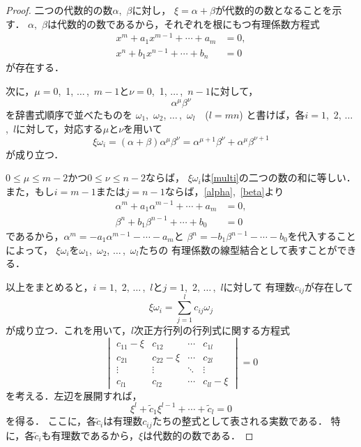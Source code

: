\documentclass[uplatex]{jsarticle}
\theoremstyle{definition}
\begin{document}
\begin{proof}
二つの代数的の数$\alpha$,~$\beta$に対し，
$\xi=\alpha+\beta$が代数的の数となることを示す．
$\alpha$,~$\beta$は代数的の数であるから，それぞれを根にもつ有理係数方程式
\begin{align}
  x^m+a_1x^{m-1}+\cdots+a_m&=0,\label{alpha}\\
  x^n+b_1x^{n-1}+\cdots+b_n&=0 \label{beta}
\end{align}
が存在する．

次に，$\mu=0$,~1, $\ldots\,$,~$m-1$と$\nu=0$,~1, $\ldots\,$,~$n-1$に対して，
\begin{equation}
  \alpha^{\mu}\beta^{\nu}\label{multi}
\end{equation}
を辞書式順序で並べたものを
$\omega_1$,~$\omega_2$, $\ldots\,$,~$\omega_l$\ \ ($l=mn$)%
と書けば，各$i=1$,~2, $\ldots\,$,~$l$に対して，対応する$\mu$と$\nu$を用いて
\[
  \xi\omega_i=(\alpha+\beta)\alpha^{\mu}\beta^{\nu}
  =\alpha^{\mu+1}\beta^{\nu}+\alpha^{\mu}\beta^{\nu+1}
\]
が成り立つ．

$0\leq\mu\leq m-2$かつ$0\leq\nu\leq n-2$ならば，
$\xi\omega_i$は\eqref{multi}の二つの数の和に等しい．
また，もし$i=m-1$または$j=n-1$ならば，\eqref{alpha},~\eqref{beta}より
\begin{align*}
  \alpha^m+a_1\alpha^{m-1}+\cdots+a_m&=0,\\
  \beta^n+b_1\beta^{n-1}+\cdots+b_0&=0
\end{align*}
であるから，$\alpha^m=-a_1\alpha^{m-1}-\cdots-a_m$と
$\beta^n=-b_1\beta^{n-1}-\cdots-b_0$を代入することによって，
$\xi\omega_i$を$\omega_1$,~$\omega_2$, $\ldots\,$,~$\omega_l$たちの
有理係数の線型結合として表すことができる．

以上をまとめると，$i=1$,~2, $\ldots\,$,~$l$と$j=1$,~2, $\ldots\,$,~$l$に対して
有理数$c_{ij}$が存在して
\[
  \xi\omega_i=\sum_{j=1}^lc_{ij}\omega_j
\]
が成り立つ．これを用いて，$l$次正方行列の行列式に関する方程式
\[
  \begin{vmatrix}
    c_{11}-\xi &c_{12}     &\cdots &c_{1l}\\
    c_{21}     &c_{22}-\xi &\cdots &c_{2l}\\
    \vdots     &\vdots     &\ddots &\vdots\\
    c_{l1}     &c_{l2}     &\cdots &c_{ll}-\xi
  \end{vmatrix}
  =0
\]
を考える．左辺を展開すれば，
\[
  \xi^l+{\tilde{c}}_1\xi^{l-1}+\cdots+{\tilde{c}}_l=0
\]
を得る．
ここに，各${\tilde{c}}_i$は有理数$c_{ij}$たちの整式として表される実数である．
特に，各${\tilde{c}}_i$も有理数であるから，$\xi$は代数的の数である．
\end{proof}
\end{document}
